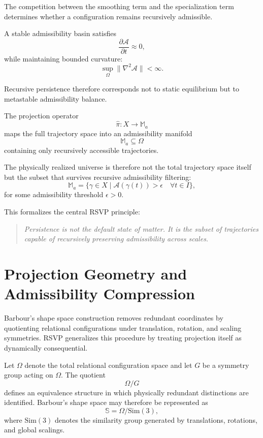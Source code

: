 \documentclass[12pt, a4paper]{article}
\newcommand{\Afield}{\mathcal{A}}
\newcommand{\proj}{\hat{\pi}}
\newcommand{\Madm}{\mathbb{M}_{a}}
\newcommand{\Xtraj}{X}
\begin{document}
The competition between the smoothing term and the specialization term
determines whether a configuration remains recursively admissible.

A stable admissibility basin satisfies
\[
\frac{\partial \Afield}{\partial t} \approx 0,
\]
while maintaining bounded curvature:
\[
\sup_{\Omega} \|\nabla^2 \Afield\| < \infty.
\]

Recursive persistence therefore corresponds not to static equilibrium but to
metastable admissibility balance.

The projection operator
\[
\proj : \Xtraj \to \Madm
\]
maps the full trajectory space into an admissibility manifold
\[
\Madm \subseteq \Omega
\]
containing only recursively accessible trajectories.

The physically realized universe is therefore not the total trajectory space
itself but the subset that survives recursive admissibility filtering:
\[
\Madm
=
\{ \gamma \in \Xtraj \mid \Afield(\gamma(t)) > \epsilon
\quad \forall t \in I \},
\]
for some admissibility threshold \(\epsilon > 0\).

This formalizes the central RSVP principle:

\begin{quote}
\itshape
Persistence is not the default state of matter.
It is the subset of trajectories capable of recursively preserving
admissibility across scales.
\end{quote}

\section{Projection Geometry and Admissibility Compression}

Barbour's shape space construction removes redundant coordinates by
quotienting relational configurations under translation, rotation, and
scaling symmetries. RSVP generalizes this procedure by treating projection
itself as dynamically consequential.

Let \(\Omega\) denote the total relational configuration space and let
\(G\) be a symmetry group acting on \(\Omega\). The quotient
\[
\Omega / G
\]
defines an equivalence structure in which physically redundant distinctions
are identified. Barbour's shape space may therefore be represented as
\[
\mathbb{S}
=
\Omega / \mathrm{Sim}(3),
\]
where \(\mathrm{Sim}(3)\) denotes the similarity group generated by
translations, rotations, and global scalings.
\end{document}
